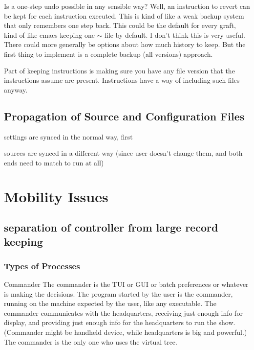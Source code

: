 \documentclass{book}
\begin{document}
Is a one-step undo possible in any sensible way?  Well, an instruction to revert can be kept for each instruction executed.  This is kind of like a weak backup system that only remembers one step back.  This could be the default for every graft, kind of like emacs keeping one $\sim$ file by default.  I don't think this is very useful.  There could more generally be options about how much history to keep.  But the first thing to implement is a complete backup (all versions) approach.

Part of keeping instructions is making sure you have any file version that the instructions assume are present.  Instructions have a way of including such files anyway.




\section{Propagation of Source and Configuration Files}

      settings are synced in the normal way, first

      sources are synced in a different way (since user doesn't change them, and both ends need to match to run at all)




\chapter{Mobility Issues}\label{chap:mobility}




\section{separation of controller from large record keeping}


\subsection{Types of Processes}

Commander
	The commander is the TUI or GUI or batch preferences or whatever is making the decisions.
	The program started by the user is the commander, running on the machine expected by the user, like any executable.
	The commander communicates with the headquarters, receiving just enough info for display, and providing just enough info for the headquarters to run the show.  (Commander might be handheld device, while headquarters is big and powerful.)
	The commander is the only one who uses the virtual tree.
\end{document}
